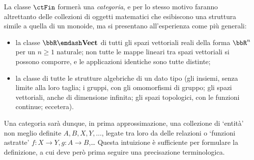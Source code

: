 \begin{example}
	La classe \(\ctFin\) formerà una \emph{categoria}, e per lo stesso motivo faranno altrettanto delle collezioni di oggetti matematici che esibiscono una struttura simile a quella di un monoide, ma si presentano all'esperienza come più generali:
	\begin{itemize}
		\item {} la classe \(\bbR\emdash\ctVect\) di tutti gli spazi vettoriali reali della forma \(\bbR^n\) per un \(n\ge 1\) naturale; non tutte le mappe lineari tra spazi vettoriali si possono comporre, e le applicazioni identiche sono tutte distinte;
		\item la classe di tutte le strutture algebriche di un dato tipo (gli insiemi, senza limite alla loro taglia; i gruppi, con gli omomorfismi di gruppo; gli spazi vettoriali, anche di dimensione infinita; gli spazi topologici, con le funzioni continue; eccetera).
	\end{itemize}
\end{example}
Una categoria sarà dunque, in prima approssimazione, una collezione di `entità' non meglio definite $A,B,X,Y,\dots$, legate tra loro da delle relazioni o `funzioni astratte' $f : X\to Y, g : A\to B$,\dots{} Questa intuizione è sufficiente per formulare la definizione, a cui deve però prima seguire una precisazione terminologica.
